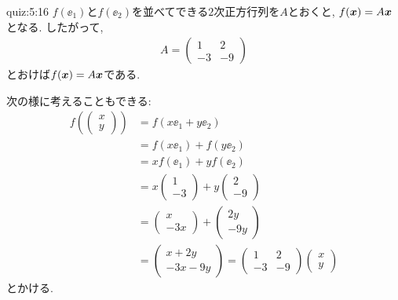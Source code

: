 \begin{answerof}{quiz:5:16}
  $f(\ee_1)$と$f(\ee_2)$を並べてできる$2$次正方行列を$A$とおくと,
  $f(\boldsymbol{x})=A\boldsymbol{x}$となる.
  したがって,
  \begin{align*}
    A=\begin{pmatrix}1&2\\-3&-9\end{pmatrix}
  \end{align*}
  とおけば$f(\boldsymbol{x})=A\boldsymbol{x}$である.

  次の様に考えることもできる:
  \begin{align*}
    f(\begin{pmatrix}x\\y\end{pmatrix})
      &=f(x\ee_1+y\ee_2)\\
      &=f(x\ee_1)+f(y\ee_2)\\
      &=xf(\ee_1)+yf(\ee_2)\\
      &=x\begin{pmatrix}1\\-3\end{pmatrix}+y\begin{pmatrix}2\\-9\end{pmatrix}\\
      &=\begin{pmatrix}x\\-3x\end{pmatrix}+\begin{pmatrix}2y\\-9y\end{pmatrix}\\
      &=\begin{pmatrix}x+2y\\-3x-9y\end{pmatrix}
      =\begin{pmatrix}1&2\\-3&-9\end{pmatrix}\begin{pmatrix}x\\y\end{pmatrix}
  \end{align*}
  とかける.
\end{answerof}

